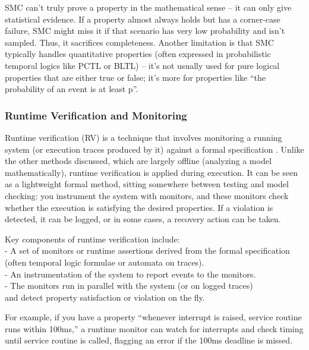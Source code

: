 SMC can’t truly prove a property in the mathematical sense – it can only give statistical evidence.
If a property almost always holds but has a corner-case failure, SMC
might miss it if that scenario has very low probability and isn’t sampled. Thus, it sacrifices completeness.
Another limitation is that SMC typically handles quantitative properties (often expressed in probabilistic
temporal logics like PCTL or BLTL) – it’s not usually used for pure logical properties that are either true or
false; it’s more for properties like “the probability of an event is at least p”.



\subsubsection{Runtime Verification and Monitoring}

Runtime verification (RV) is a technique that involves monitoring a running 
system (or execution traces produced by it) against a formal specification \cite{Hinrichs2014ModelCheckRuntimeVerify}. 
Unlike the other methods discussed, which are largely offline
(analyzing a model mathematically), runtime verification is applied during execution. It can be seen as a
lightweight formal method, sitting somewhere between testing and model checking: you instrument the
system with monitors, and these monitors check whether the execution is satisfying the desired properties.
If a violation is detected, it can be logged, or in some cases, a recovery action can be taken.

Key components of runtime verification include:\\ 
- A set of monitors or runtime assertions derived from the formal specification 
(often temporal logic formulae or automata on traces).\\
- An instrumentation of the system to report events to the monitors.\\
- The monitors run in parallel with the system (or on logged traces)\\
and detect property satisfaction or violation on the fly.

For example, if you have a property “whenever interrupt is raised, service routine runs within 100ms,” a
runtime monitor can watch for interrupts and check timing until service routine is called, flagging an error if
the 100ms deadline is missed.

